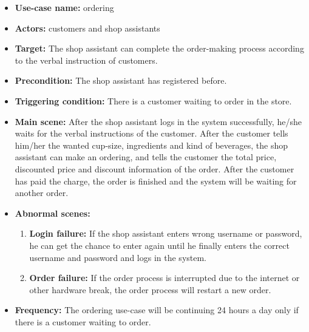 \documentclass[a4paper]{report}
\begin{document}
\begin{itemize}
\item \textbf{Use-case name:} ordering
\item \textbf{Actors:} customers and shop assistants
\item \textbf{Target:} The shop assistant can complete the order-making process according to the verbal instruction of customers.
\item \textbf{Precondition:} The shop assistant has registered before. 
\item \textbf{Triggering condition:} There is a customer waiting to order in the store.
\item \textbf{Main scene:} After the shop assistant logs in the system successfully, he/she waits for the verbal instructions of the customer. After the customer tells him/her the wanted cup-size, ingredients and kind of  beverages, the shop assistant can make an ordering, and tells the customer the total price, discounted price and discount information of the order. After the customer has paid the charge, the order is finished and the system will be waiting for another order.
\item \textbf{Abnormal scenes:}
\begin{enumerate}
\item  \textbf{Login failure:} If the shop assistant enters wrong username or password, he can get the chance to enter again until he finally enters the correct username and password and logs in the system. 

\item \textbf{Order failure:} If the order process is interrupted due to the internet or other hardware break, the order process will restart a new order.\end{enumerate}
\item \textbf{Frequency:} The ordering use-case will be continuing 24 hours a day only if there is a customer waiting to order.
\end{itemize}
\end{document}
